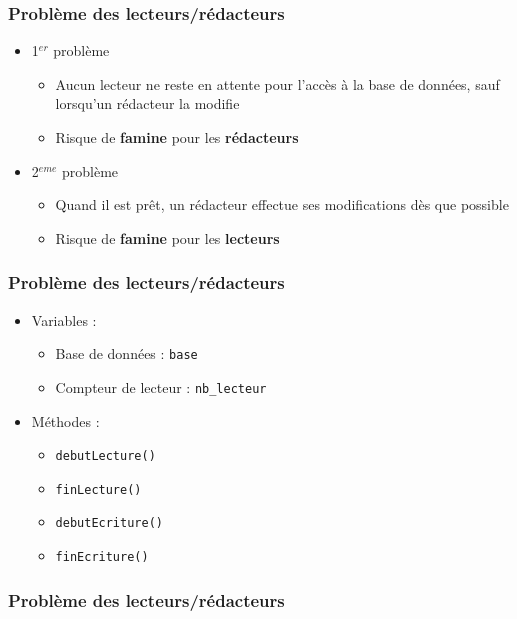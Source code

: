 \begin{frame}
\frametitle{Problème des lecteurs/rédacteurs}
\begin{itemize}
\item <1-> 1$^{er}$ problème
\begin{itemize}
\item Aucun lecteur ne reste en attente pour l’accès à la base de données, sauf lorsqu’un rédacteur la modifie
\item Risque de \textbf{famine} pour les \textbf{rédacteurs}
\end{itemize}
\item <2-> 2$^{eme}$ problème
\begin{itemize}
\item Quand il est prêt, un rédacteur effectue ses modifications dès que possible
\item Risque de \textbf{famine} pour les \textbf{lecteurs} 
\end{itemize}
\end{itemize}
\end{frame}

\begin{frame}
\frametitle{Problème des lecteurs/rédacteurs}
\begin{itemize}
\item Variables :
\begin{itemize}
\item Base de données : \texttt{base}
\item Compteur de lecteur : \texttt{nb\_lecteur}
\end{itemize}
\item Méthodes :
\begin{itemize}
\item \texttt{debutLecture()}
\item \texttt{finLecture()}
\item \texttt{debutEcriture()}
\item \texttt{finEcriture()}
\end{itemize}
\end{itemize}
\end{frame}

\begin{frame}
\frametitle{Problème des lecteurs/rédacteurs}
\begin{columns}
\begin{scriptsize}\end{scriptsize}
\begin{scriptsize}\end{scriptsize}
\end{columns}
\end{frame}


